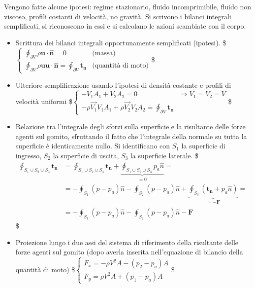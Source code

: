 \documentclass[letterpaper,10pt,italian]{jupyterBook}
\begin{document}
\sphinxAtStartPar
Vengono fatte alcune ipotesi: regime stazionario, fluido incomprimibile,
fluido non viscoso, profili costanti di velocità, no gravità. Si
scrivono i bilanci integrali semplificati, si riconoscono in essi e si
calcolano le azioni scambiate con il corpo.
\begin{itemize}
\item {} 
\sphinxAtStartPar
Scrittura dei bilanci integrali opportunamente semplificati
(ipotesi). \$\(\begin{cases}
      \oint_{\partial V} \rho \bm{u} \cdot \hat{\bm{n}} = 0  & \text{(massa)} \\
      \oint_{\partial V} \rho \bm{u} \bm{u} \cdot \hat{\bm{n}} = \oint_{\partial V} \bm{t_n} & \text{(quantità di moto)}
     \end{cases}\)\$

\item {} 
\sphinxAtStartPar
Ulteriore semplificazione usando l’ipotesi di densità costante e
profili di velocità uniformi \$\(\begin{cases}
      -V_1 A_1 + V_2 A_2 = 0 \qquad \qquad \qquad \Rightarrow  V_1 = V_2 = V \\
      - \rho \vec{V_1} V_1 A_1 + \rho \vec{V_2} V_2 A_2 = \oint_{\partial V} \bm{t_n}
     \end{cases}\)\$

\item {} 
\sphinxAtStartPar
Relazione tra l’integrale degli sforzi sulla superficie e la
risultante delle forze agenti sul gomito, sfruttando il fatto che
l’integrale della normale su tutta la superficie è identicamente
nullo. Si identificano con \(S_1\) la superficie di ingresso, \(S_2\) la
superficie di uscita, \(S_3\) la superficie laterale.
\$\(\begin{aligned}
       \displaystyle\oint_{S_1\cup S_2\cup S_3} \bm{t_n} & =  \displaystyle\oint_{S_1\cup S_2\cup S_3} \bm{t_n} + \underbrace{\displaystyle\oint_{S_1\cup S_2\cup S_3} p_a \hat{n}}_{=0} = \\
      & = -\oint_{S_1} (p-p_a) \hat{n} - \oint_{S_2} (p-p_a) \hat{n} + \underbrace{\oint_{S_3} (\bm{t_n}+p_a \hat{n})}_{=-\bm{F}} =  \\
      & = -\oint_{S_1} (p-p_a) \hat{n} - \oint_{S_2} (p-p_a) \hat{n} - \bm{F} 
     \end{aligned}\)\$

\item {} 
\sphinxAtStartPar
Proiezione lungo i due assi del sistema di riferimento della
risultante delle forze agenti sul gomito (dopo averla inserita
nell’equazione di bilancio della quantità di moto) \$\(\begin{cases}
    F_x = - \rho V^2 A - (p_2 - p_a)A   \\
    F_y =  \rho V^2 A + (p_1 - p_a)A  
  \end{cases}\)\$

\end{itemize}
\end{document}
